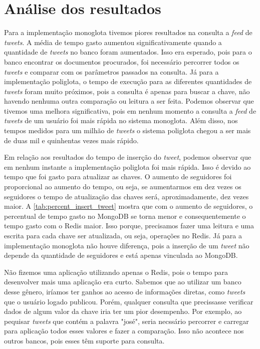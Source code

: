 


\section{Análise dos resultados}
\label{sec:resultEval}

Para a implementação monoglota tivemos piores resultados na consulta a \textit{feed} de \textit{tweets}. A média de tempo gasto aumentou significativamente quando a quantidade de \textit{tweets} no banco foram aumentados. Isso era esperado, pois para o banco encontrar os documentos procurados, foi necessário percorrer todos os \textit{tweets} e comparar com os parâmetros passados na consulta.
Já para a implementação poliglota, o tempo de execução para as diferentes quantidades de \textit{tweets} foram muito próximos, pois a consulta é apenas para buscar a chave, não havendo nenhuma outra comparação ou leitura a ser feita.
Podemos observar que tivemos uma melhora significativa, pois em nenhum momento a consulta a \textit{feed} de \textit{tweets} de um usuário foi mais rápida no sistema monoglota. Além disso, nos tempos medidos para um milhão de \textit{tweets} o sistema poliglota chegou a ser mais de duas mil e quinhentas vezes mais rápido.

Em relação aos resultados do tempo de inserção do \textit{tweet}, podemos observar que em nenhum instante a implementação poliglota foi mais rápida. Isso é devido ao tempo que foi gasto para atualizar as chaves. O aumento de seguidores foi proporcional ao aumento do tempo, ou seja, se aumentarmos em dez vezes os seguidores o tempo de atualização das chaves será, aproximadamente, dez vezes maior. A \autoref{tab:percent_insert_tweet} mostra que com o aumento de seguidores, o percentual de tempo gasto no MongoDB se torna menor e consequentemente o tempo gasto com o \ac{Redis} maior.
Isso porque, precisamos fazer uma leitura e uma escrita para cada chave ser atualizada, ou seja, operações no \ac{Redis}. Já para a implementação monoglota não houve diferença, pois a inserção de um \textit{tweet} não depende da quantidade de seguidores e está apenas vinculada ao MongoDB.

Não fizemos uma aplicação utilizando apenas o Redis, pois o tempo para desenvolver mais uma aplicação era curto. Sabemos que ao utilizar um banco desse gênero, iríamos ter ganhos ao acesso de informações diretas, como \textit{tweets} que o usuário logado publicou. Porém, qualquer consulta que precissasse verificar dados de algum valor da chave iria ter um pior desempenho. Por exemplo, ao pequisar \textit{tweets} que contém a palavra "josé", seria necssário percorrer e carregar para aplicação todos esses valores e fazer a comparação. Isso não acontece nos outros bancos, pois esses têm suporte para consulta.


